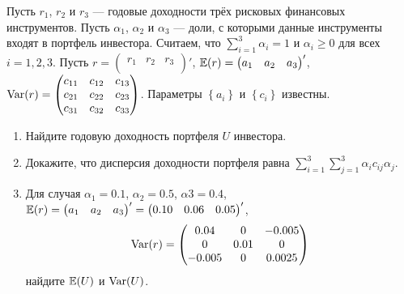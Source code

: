 \begin{problem}
Пусть $r_1$, $r_2$ и $r_3$ — годовые доходности трёх рисковых финансовых инструментов. Пусть $\alpha_1$, $\alpha_2$ и $\alpha_3$ — доли, с которыми данные инструменты входят в портфель инвестора. Считаем, что $\sum_{i=1}^3 \alpha_i = 1$ и $\alpha_i \geqslant 0$ для всех $i=1,2,3$. Пусть $r =  \begin{pmatrix}
r_1 & r_2 & r_3\\
\end{pmatrix} '$, $\mathbb{E} (r) =  \begin{pmatrix}
a_1 & a_2 & a_3\\
\end{pmatrix} '$, $\operatorname{Var} (r) =  \begin{pmatrix}
c_{11} & c_{12} & c_{13} \\
c_{21} & c_{22} & c_{23} \\
c_{31} & c_{32} & c_{33} \\
\end{pmatrix} $. Параметры $\left\lbrace a_i \right\rbrace$ и $\left\lbrace c_i \right\rbrace$ известны.

\begin{enumerate}
\item Найдите годовую доходность портфеля $U$ инвестора.
\item Докажите, что дисперсия доходности портфеля равна $\sum_{i=1}^3 \sum_{j=1}^3 \alpha_i c_{ij} \alpha_j$.
\item Для случая $\alpha_1 = 0.1$, $\alpha_2 = 0.5$, $\alpha3 = 0.4$, $\mathbb{E} (r) =  \begin{pmatrix}
a_1 & a_2 & a_3\\
\end{pmatrix} ' =  \begin{pmatrix}
0.10 & 0.06 & 0.05 \\
\end{pmatrix} '$,
\[
\operatorname{Var} (r) =  \begin{pmatrix}
0.04 & 0 & -0.005\\
0 & 0.01 & 0\\
-0.005 & 0 & 0.0025\\
\end{pmatrix}
\]
найдите $\mathbb{E} (U)$ и $\operatorname{Var} (U)$.
\end{enumerate}



\begin{sol}
\end{sol}
\end{problem}



